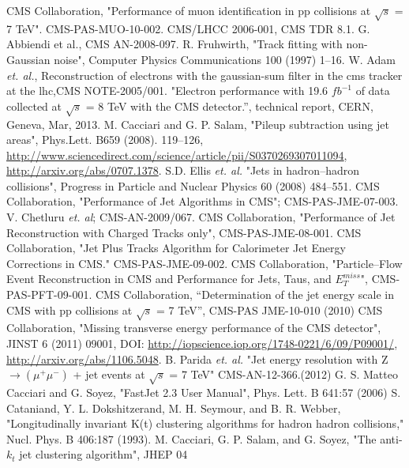 \begin{thebibliography}{99}
 CMS Collaboration, "Performance of muon identiﬁcation in pp collisions at $\sqrt {s}$ = 7 TeV". CMS-PAS-MUO-10-002.
 CMS/LHCC 2006-001, CMS TDR 8.1.
 G. Abbiendi et al., CMS AN-2008-097.
 R. Fruhwirth, "Track fitting with non-Gaussian noise", Computer Physics Communications 100 (1997) 1–16. 
 W. Adam {\it et. al.}, Reconstruction of electrons with the gaussian-sum filter in the cms tracker at the lhc,CMS NOTE-2005/001.
 "Electron performance with 19.6 $fb^{-1}$ of data collected at $\sqrt {s} $ = 8 TeV with the CMS detector.”, technical report, CERN, Geneva, Mar, 2013.
 M. Cacciari and G. P. Salam, "Pileup subtraction using jet areas", Phys.Lett. B659 (2008).
119–126, {\url{http://www.sciencedirect.com/science/article/pii/S0370269307011094}}, \url{http://arxiv.org/abs/0707.1378}.
 S.D. Ellis {\it et. al.} "Jets in hadron–hadron collisions", Progress in Particle and Nuclear Physics 60 (2008) 484–551.
 CMS Collaboration, "Performance of Jet Algorithms in CMS"; CMS-PAS-JME-07-003.
 V. Chetluru {\it et. al}; CMS-AN-2009/067.
 CMS Collaboration, "Performance of Jet Reconstruction with Charged Tracks only", CMS-PAS-JME-08-001.
  CMS Collaboration, "Jet Plus Tracks Algorithm for Calorimeter Jet Energy Corrections in CMS." CMS-PAS-JME-09-002.
 CMS Collaboration, "Particle–Flow Event Reconstruction in CMS and Performance for Jets, Taus, and $E_T^{miss}$", CMS-PAS-PFT-09-001.
CMS Collaboration, “Determination of the jet energy scale in CMS with pp collisions at $\sqrt {s}$ = 7 TeV”, CMS-PAS JME-10-010 (2010)
 CMS Collaboration, "Missing transverse energy performance of the CMS detector", JINST 6 (2011) 09001, DOI: {\url{http://iopscience.iop.org/1748-0221/6/09/P09001/}}, {\url{http://arxiv.org/abs/1106.5048}}.
 B. Parida {\it et. al.} "Jet energy resolution with Z$\rightarrow(\mu^+\mu^-)$ + jet events at $\sqrt {s}$ = 7 TeV" CMS-AN-12-366.(2012)
 G. S. Matteo Cacciari and G. Soyez, "FastJet 2.3 User Manual", Phys. Lett. B 641:57 (2006)
 S. Cataniand, Y. L. Dokshitzerand, M. H. Seymour, and B. R. Webber, "Longitudinally
invariant K(t) clustering algorithms for hadron hadron collisions," Nucl. Phys. B 406:187 (1993).
 M. Cacciari, G. P. Salam, and G. Soyez, "The anti-$k_t$ jet clustering algorithm", JHEP 04

\end{thebibliography}
